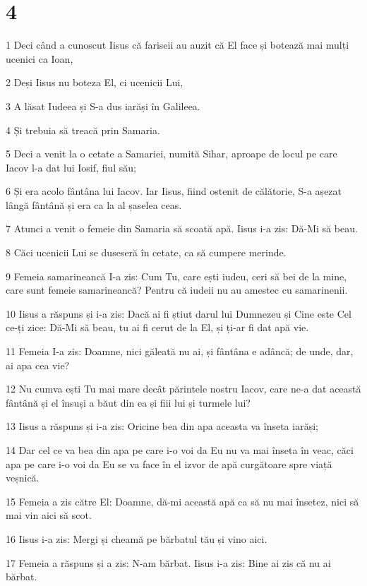 \chapter{4}

\par 1 Deci când a cunoscut Iisus că fariseii au auzit că El face și botează mai mulți ucenici ca Ioan,
\par 2 Deși Iisus nu boteza El, ci ucenicii Lui,
\par 3 A lăsat Iudeea și S-a dus iarăși în Galileea.
\par 4 Și trebuia să treacă prin Samaria.
\par 5 Deci a venit la o cetate a Samariei, numită Sihar, aproape de locul pe care Iacov l-a dat lui Iosif, fiul său;
\par 6 Și era acolo fântâna lui Iacov. Iar Iisus, fiind ostenit de călătorie, S-a așezat lângă fântână și era ca la al șaselea ceas.
\par 7 Atunci a venit o femeie din Samaria să scoată apă. Iisus i-a zis: Dă-Mi să beau.
\par 8 Căci ucenicii Lui se duseseră în cetate, ca să cumpere merinde.
\par 9 Femeia samarineancă I-a zis: Cum Tu, care ești iudeu, ceri să bei de la mine, care sunt femeie samarineancă? Pentru că iudeii nu au amestec cu samarinenii.
\par 10 Iisus a răspuns și i-a zis: Dacă ai fi știut darul lui Dumnezeu și Cine este Cel ce-ți zice: Dă-Mi să beau, tu ai fi cerut de la El, și ți-ar fi dat apă vie.
\par 11 Femeia I-a zis: Doamne, nici găleată nu ai, și fântâna e adâncă; de unde, dar, ai apa cea vie?
\par 12 Nu cumva ești Tu mai mare decât părintele nostru Iacov, care ne-a dat această fântână și el însuși a băut din ea și fiii lui și turmele lui?
\par 13 Iisus a răspuns și i-a zis: Oricine bea din apa aceasta va înseta iarăși;
\par 14 Dar cel ce va bea din apa pe care i-o voi da Eu nu va mai înseta în veac, căci apa pe care i-o voi da Eu se va face în el izvor de apă curgătoare spre viață veșnică.
\par 15 Femeia a zis către El: Doamne, dă-mi această apă ca să nu mai însetez, nici să mai vin aici să scot.
\par 16 Iisus i-a zis: Mergi și cheamă pe bărbatul tău și vino aici.
\par 17 Femeia a răspuns și a zis: N-am bărbat. Iisus i-a zis: Bine ai zis că nu ai bărbat.
